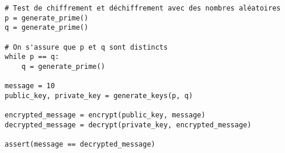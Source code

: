 \begin{tcolorbox}[
    enhanced,
    attach boxed title to top left={xshift=6mm,yshift=-3mm},
    colback=lightgreen!20,
    colframe=lightgreen,
    colbacktitle=lightgreen,
    title=Test de notre programme de chiffrement RSA,
    fonttitle=\bfseries\color{black},
    boxed title style={size=small,colframe=lightgreen,sharp corners},
    sharp corners,
]    
    \begin{verbatim}
# Test de chiffrement et déchiffrement avec des nombres aléatoires
p = generate_prime()
q = generate_prime()

# On s'assure que p et q sont distincts
while p == q:
    q = generate_prime()

message = 10
public_key, private_key = generate_keys(p, q)

encrypted_message = encrypt(public_key, message)
decrypted_message = decrypt(private_key, encrypted_message)

assert(message == decrypted_message)
    \end{verbatim}
\end{tcolorbox}